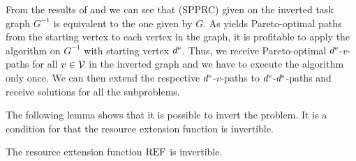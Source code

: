 From the results of  and  we can see that (SPPRC) given on the inverted task graph $G^{-1}$ is equivalent to the one given by $G$. As  yields Pareto-optimal paths from the starting vertex to each vertex in the graph, it is profitable to apply the algorithm on $G^{-1}$ with starting vertex $d^{\operatorname{e}}$. Thus, we receive Pareto-optimal $d^{\operatorname{e}}$-$v$-paths for all $v\in\mathcal{V}$ in the inverted graph and we have to execute the algorithm only once. We can then extend the respective $d^{\operatorname{e}}$-$v$-paths to $d^{\operatorname{e}}$-$d^{\operatorname{s}}$-paths and receive solutions for all the subproblems.

The following lemma shows that it is possible to invert the problem. It is a condition for  that the resource extension function is invertible.

\begin{lemma}

The resource extension function $\operatorname{REF}$ is invertible. 

\end{lemma}

